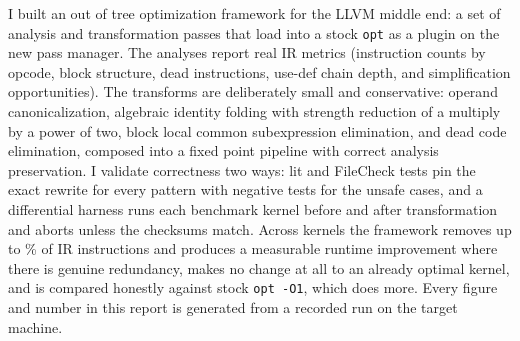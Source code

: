 I built an out of tree optimization framework for the LLVM middle end: a set of
analysis and transformation passes that load into a stock \texttt{opt} as a
plugin on the new pass manager. The analyses report real IR metrics (instruction
counts by opcode, block structure, dead instructions, use-def chain depth, and
simplification opportunities). The transforms are deliberately small and
conservative: operand canonicalization, algebraic identity folding with strength
reduction of a multiply by a power of two, block local common subexpression
elimination, and dead code elimination, composed into a fixed point pipeline
with correct analysis preservation. I validate correctness two ways: lit and
FileCheck tests pin the exact rewrite for every pattern with negative tests for
the unsafe cases, and a differential harness runs each benchmark kernel before
and after transformation and aborts unless the checksums match. Across
\NumKernels{} kernels the framework removes up to \ArithRedundantReduction\% of
IR instructions and produces a measurable runtime improvement where there is
genuine redundancy, makes no change at all to an already optimal kernel, and is
compared honestly against stock \texttt{opt -O1}, which does more. Every figure
and number in this report is generated from a recorded run on the target
machine.

